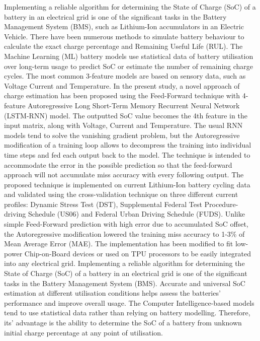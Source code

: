 %
 {
Implementing a reliable algorithm for determining the State of Charge (SoC) of a battery in an electrical grid is one of the significant tasks in the Battery Management System (BMS), such as Lithium-Ion accumulators in an Electric Vehicle.
There have been numerous methods to simulate battery behaviour to calculate the exact charge percentage and Remaining Useful Life (RUL).
The Machine Learning (ML) battery models use statistical data of battery utilisation over long-term usage to predict SoC or estimate the number of remaining charge cycles.
The most common 3-feature models are based on sensory data, such as Voltage Current and Temperature.
In the present study, a novel approach of charge estimation has been proposed using the Feed-Forward technique with 4-feature Autoregressive Long Short-Term Memory Recurrent Neural Network (LSTM-RNN) model.
The outputted SoC value becomes the 4th feature in the input matrix, along with Voltage, Current and Temperature.
The usual RNN models tend to solve the vanishing gradient problem, but the Autoregressive modification of a training loop allows to decompress the training into individual time steps and fed each output back to the model.
The technique is intended to accommodate the error in the possible prediction so that the feed-forward approach will not accumulate miss accuracy with every following output.
The proposed technique is implemented on current Lithium-Ion battery cycling data and validated using the cross-validation technique on three different current profiles: Dynamic Stress Test (DST), Supplemental Federal Test Procedure-driving Schedule (US06) and Federal Urban Driving Schedule (FUDS).
Unlike simple Feed-Forward prediction with high error due to accumulated  SoC offset, the Autoregressive modification lowered the training miss accuracy to 1-3\% of Mean Average Error (MAE).
The implementation has been modified to fit low-power Chip-on-Board devices or used on TPU processors to be easily integrated into any electrical grid.
}{
    Implementing a reliable algorithm for determining the State of Charge (SoC) of a battery in an electrical grid is one of the significant tasks in the Battery Management System (BMS).
    Accurate and universal SoC estimation at different utilisation conditions helps assess the batteries' performance and improve overall usage.
    The Computer Intelligence-based models tend to use statistical data rather than relying on battery modelling.
    Therefore, its' advantage is the ability to determine the SoC of a battery from unknown initial charge percentage at any point of utilisation.
}
